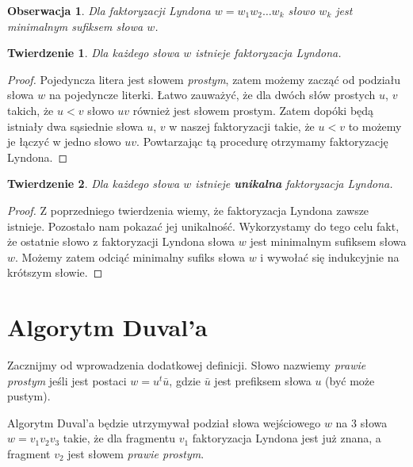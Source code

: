 \documentclass{article}
\newtheorem{theorem}{Twierdzenie}
\newtheorem{observation}{Obserwacja}
\begin{document}
\begin{observation}
    Dla faktoryzacji Lyndona $w = w_1w_2\ldots w_k$ słowo $w_k$ jest minimalnym sufiksem słowa $w$. 
\end{observation}

\begin{theorem}
    Dla każdego słowa $w$ istnieje faktoryzacja Lyndona.
\end{theorem}

\begin{proof}
    Pojedyncza litera jest słowem \textit{prostym}, zatem możemy zacząć od podziału słowa $w$ na pojedyncze literki.
    Łatwo zauważyć, że dla dwóch słów prostych $u$, $v$ takich, że $u < v$ słowo $uv$ również jest słowem prostym.
    Zatem dopóki będą istniały dwa sąsiednie słowa $u$, $v$ w naszej faktoryzacji takie, że $u < v$ to możemy je łączyć w jedno słowo $uv$.
    Powtarzając tą procedurę otrzymamy faktoryzację Lyndona.
\end{proof}

\begin{theorem}
    Dla każdego słowa $w$ istnieje \textbf{unikalna} faktoryzacja Lyndona.
\end{theorem}

\begin{proof}
    Z poprzedniego twierdzenia wiemy, że faktoryzacja Lyndona zawsze istnieje. Pozostało nam pokazać jej unikalność.
    Wykorzystamy do tego celu fakt, że ostatnie słowo z faktoryzacji Lyndona słowa $w$ jest minimalnym sufiksem słowa $w$. 
    Możemy zatem odciąć minimalny sufiks słowa $w$ i wywołać się indukcyjnie na krótszym słowie.
\end{proof}

\section{Algorytm Duval'a}

Zacznijmy od wprowadzenia dodatkowej definicji. Słowo nazwiemy \textit{prawie prostym} jeśli jest postaci $w = u^t\bar{u}$, gdzie 
$\bar{u}$ jest prefiksem słowa $u$ (być może pustym).

Algorytm Duval'a będzie utrzymywał podział słowa wejściowego $w$ na $3$ słowa $w=v_1v_2v_3$ takie, że dla fragmentu $v_1$ faktoryzacja Lyndona jest już znana, 
a fragment $v_2$ jest słowem \textit{prawie prostym}. 
\end{document}

